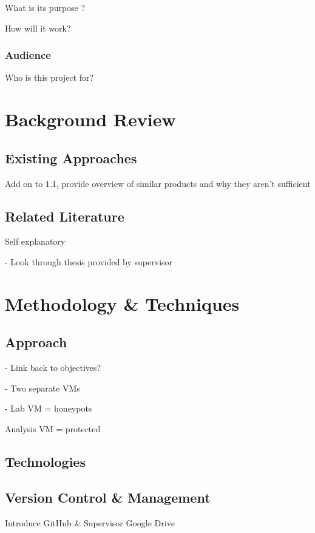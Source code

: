 \documentclass[a4paper,12pt,oneside]{book}			%
\begin{document}
What is its purpose ?

How will it work?


\subsection{Audience}\label{sec:audience}

Who is this project for?

\chapter{Background Review}\label{ch:backgroundReview}

\section{Existing Approaches}\label{sec:existingApproaches}

Add on to 1.1, provide overview of similar products and why they aren't sufficient

\section{Related Literature}\label{sec:relatedLiterature}

Self explanatory

- Look through thesis provided by supervisor


\chapter{Methodology \&{} Techniques}\label{ch:methods}
\section{Approach}\label{sec:approach}
- Link back to objectives?

- Two separate VMs

- Lab VM = honeypots

Analysis VM = protected

\section{Technologies}\label{sec:technologies}
\section{Version Control \&{} Management}\label{sec:versionControl}
Introduce GitHub \&{} Supervisor Google Drive
\end{document}
